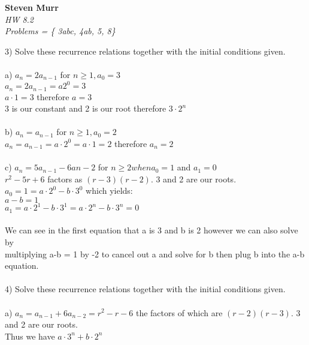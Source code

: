 \documentclass{article}
\begin{document}
\setcounter{totalnumber}{5}
   \begin{flushright}
      \Large\textbf{Steven Murr}\\
      \large\textit{HW 8.2} \\
      \large\textit{ Problems = \{ 3abc, 4ab, 5, 8\} } 
   \end{flushright}
\begin{flushleft}
\makeatletter%
\setlength{\@fptop}{5pt}
\makeatother

\setlength\parindent{0pt}3) Solve these recurrence relations together with the initial conditions given. \\
~\\ 
\setlength\parindent{24pt}a) $a_n = 2a_{n-1} $ for $n \geq 1, a_0 = 3$ \\
$a_n = 2a_{n-1} = a2^0 = 3$ \\
$a\cdot 1 = 3$ therefore $a = 3$ \\ 
3 is our constant and 2 is our root therefore $3 \cdot 2^n$ \\
~\\
b) $a_n = a_{n-1}$ for $ n \geq 1, a_0 = 2$ \\
$a_n = a_{n-1} = a\cdot 2^0 = a\cdot 1 = 2$ therefore $a_n = 2$ \\
~\\
c) $a_n = 5a_{n-1} - 6a{n-2}$ for $n \geq 2 when a_0 = 1$ and $a_1 = 0$ \\
$ r^2 - 5r + 6 $ factors as $(r-3)(r-2)$.  3 and 2 are our roots. \\
$a_0 = 1 = a\cdot2^0 - b\cdot3^0 $ which yields: \\
$a - b = 1$ \\ 
$a_1 = a\cdot2^1 - b\cdot3^1 = a\cdot2^n - b\cdot3^n = 0$ \\
~\\
We can see in the first equation that a is 3 and b is 2 however we can also solve by \\multiplying a-b = 1 by -2 to cancel out a and solve for b then plug b into the a-b equation. \\
~\\
\setlength\parindent{0pt}4) Solve these recurrence relations together with the initial conditions given.  \\
~\\
a) $a_n = a_{n-1} + 6a_{n-2} = r^2 - r - 6$ the factors of which are $(r-2)(r-3)$.  3 and 2 are our roots. \\
Thus we have $a\cdot 3^n + b\cdot 2^n$ \\ 

\end{flushleft}
\end{document}
